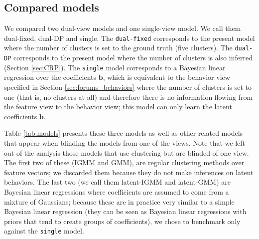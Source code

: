 \documentclass[smallextended]{svjour3}          %
\begin{document}
\subsection{Compared models}
We compared two dual-view models and one single-view model. We call them dual-fixed, dual-DP and single. The \texttt{dual-fixed} corresponds to the present model where the number of clusters is set to the ground truth (five clusters). The \texttt{dual-DP} corresponds to the present model where the number of clusters is also inferred (Section \ref{sec:CRP}). The \texttt{single} model corresponds to a Bayesian linear regression over the coefficients $\mathbf{b}$, which is equivalent to the behavior view specified in Section \ref{sec:forums_behaviors} where the number of clusters is set to one (that is, no clusters at all) and therefore there is no information flowing from the feature view to the behavior view; this model can only learn the latent coefficients $\mathbf{b}$.

Table \ref{tab:models} presents these three models as well as other related models that appear when blinding the models from one of the views. Note that we left out of the analysis those models that use clustering but are blinded of one view. The first two of these (IGMM and GMM), are regular clustering methods over feature vectors; we discarded them because they do not make inferences on latent behaviors. The last two (we call them latent-IGMM and latent-GMM) are Bayesian linear regressions where coefficients are assumed to come from a mixture of Gaussians; because these are in practice very similar to a simple Bayesian linear regression (they can be seen as Bayesian linear regressions with priors that tend to create groups of coefficients), we chose to benchmark only against the \texttt{single} model.
\end{document}
